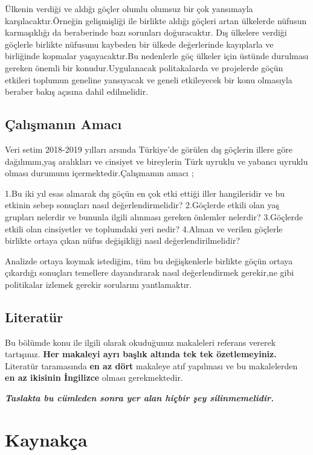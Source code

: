 \documentclass[
  12pt,
]{article}
\newlength{\cslhangindent}
\newlength{\cslentryspacingunit} %
\newenvironment{CSLReferences}[2] %
 {%
  \setlength{\parindent}{0pt}
  \ifodd #1
  \let\oldpar\par
  \def\par{\hangindent=\cslhangindent\oldpar}
  \fi
  \setlength{\parskip}{#2\cslentryspacingunit}
 }%
 {}
\begin{document}
Ülkenin verdiği ve aldığı göçler olumlu olumsuz bir çok yansımayla karşılacaktır.Örneğin gelişmişliği ile birlikte aldığı göçleri artan ülkelerde nüfusun karmaşıklığı da beraberinde bazı sorunları doğuracaktır. Dış ülkelere verdiği göçlerle birlikte nüfusunu kaybeden bir ülkede değerlerinde kayıplarla ve birliğinde kopmalar yaşayacaktır.Bu nedenlerle göç ülkeler için üstünde durulması gereken önemli bir konudur.Uygulanacak politakalarda ve projelerde göçün etkileri toplumun geneline yansıyacak ve geneli etkileyecek bir konu olmasıyla beraber bakış açısına dahil edilmelidir.

\hypertarget{uxe7alux131ux15fmanux131n-amacux131}{%
\subsection{Çalışmanın Amacı}\label{uxe7alux131ux15fmanux131n-amacux131}}

Veri setim 2018-2019 yılları arsında Türkiye'de görülen dış göçlerin illere göre dağılımını,yaş aralıkları ve cinsiyet ve bireylerin Türk uyruklu ve yabancı uyruklu olması durumunu içermektedir.Çalışmamın amacı ;

1.Bu iki yıl esas alınarak dış göçün en çok etki ettiği iller hangileridir ve bu etkinin sebep sonuçları nasıl değerlendirmelidir?
2.Göçlerde etkili olan yaş grupları nelerdir ve bununla ilgili alınması gereken önlemler nelerdir?
3.Göçlerde etkili olan cinsiyetler ve toplumdaki yeri nedir?
4.Alınan ve verilen göçlerle birlikte ortaya çıkan nüfus değişikliği nasıl değerlendirilmelidir?

Analizde ortaya koymak istediğim, tüm bu değişkenlerle birlikte göçün ortaya çıkardığı sonuçları temellere dayandırarak nasıl değerlendirmek gerekir,ne gibi politikalar izlemek gerekir sorularını yantlamaktır.

\hypertarget{literatuxfcr}{%
\subsection{Literatür}\label{literatuxfcr}}

Bu bölümde konu ile ilgili olarak okuduğunuz makaleleri referans vererek tartışınız. \textbf{Her makaleyi ayrı başlık altında tek tek özetlemeyiniz.} Literatür taramasında \textbf{en az dört} makaleye atıf yapılması ve bu makalelerden \textbf{en az ikisinin İngilizce} olması gerekmektedir.

\textbf{\emph{Taslakta bu cümleden sonra yer alan hiçbir şey silinmemelidir.}}

\newpage

\hypertarget{references}{%
\section{Kaynakça}\label{references}}

\hypertarget{refs}{}
\begin{CSLReferences}{0}{0}
\end{CSLReferences}
\end{document}
